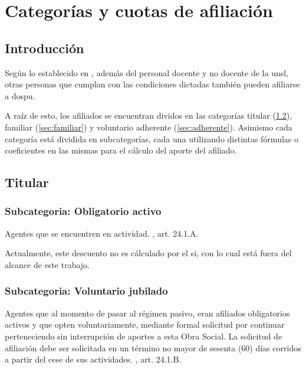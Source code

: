 \chapter{Categorías y cuotas de afiliación}

\section{Introducción}
Según lo establecido en \cite{dospuOrd53}, además del personal docente y no docente de la \acrfull{unsl}, otras personas que cumplan con las condiciones dictadas también pueden afiliarse a \acrshort{dospu}.

A raíz de esto, los afiliados se encuentran dividos en las categorías titular (\cref{sec:titular}), familiar (\cref{sec:familiar}) y voluntario adherente (\cref{sec:adherente}). Asimismo cada categoría está dividida en subcategorías, cada una utilizando distintas fórmulas o coeficientes en las mismas para el cálculo del aporte del afiliado.

\section{Titular} \label{sec:titular}

\subsection{Subcategoria: Obligatorio activo}
\begin{displayquote}
Agentes que se encuentren en actividad.
\hfill\parencite{dospuOrd53}, art. 24.1.A.
\end{displayquote}

Actualmente, este descuento no es cálculado por el \acrshort{si}, con lo cual está fuera del alcance de este trabajo.

\subsection{Subcategoria: Voluntario jubilado}
\begin{displayquote}
Agentes que al momento de pasar al régimen pasivo, eran afiliados obligatorios activos y
que opten voluntariamente, mediante formal solicitud por continuar perteneciendo sin
interrupción de aportes a esta Obra Social. La solicitud de afiliación debe ser solicitada en
un término no mayor de sesenta (60) días corridos a partir del cese de sus actividades. \hfill\parencite{dospuOrd53}, art. 24.1.B. 
\end{displayquote}

